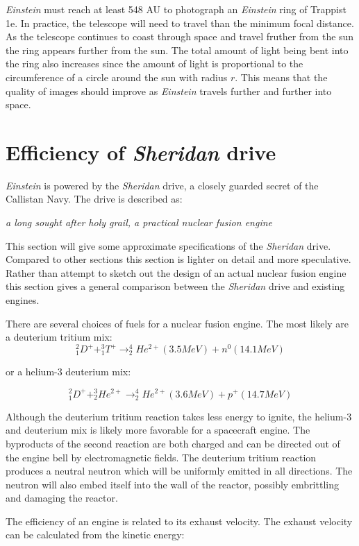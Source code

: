 \documentclass[12pt]{article} %
\begin{document}
\textit{Einstein} must reach at least 548 AU to photograph an \textit{Einstein} ring of Trappist 1e. In practice, the telescope will need to travel than the minimum focal distance. As the telescope continues to coast through space and travel fruther from the sun the  ring appears further from the sun. The total amount of light being bent into the ring also increases since the amount of light is proportional to the circumference of a circle around the sun with radius $r$. This means that the quality of images should improve as \textit{Einstein} travels further and further into space.

\section{Efficiency of \textit{Sheridan} drive}
\textit{Einstein} is powered by the \textit{Sheridan} drive, a closely guarded secret of the Callistan Navy. The drive is described as:

\hspace{2cm} \textit{a long sought after holy grail, a practical nuclear fusion engine}

This section will give some approximate specifications of the \textit{Sheridan} drive. Compared to other sections this section is lighter on detail and more speculative. Rather than attempt to sketch out the design of an actual nuclear fusion engine this section gives a general comparison between the \textit{Sheridan} drive and existing engines.

There are several choices of fuels for a nuclear fusion engine. The most likely are a deuterium tritium mix:
$$^2_1D^+ + ^3_1T^+ \rightarrow ^4_2He^{2+} (3.5 MeV) + n^0 (14.1 MeV)$$

or a helium-3 deuterium mix:

$$^2_1D^+ + ^3_2He^{2+} \rightarrow ^4_2He^{2+} (3.6 MeV) + p^+ (14.7 MeV)$$

Although the deuterium tritium reaction takes less energy to ignite, the helium-3 and deuterium mix is likely more favorable for a spacecraft engine. The byproducts of the second reaction are both charged and can be directed out of the engine bell by electromagnetic fields. The deuterium tritium reaction produces a neutral neutron which will be uniformly emitted in all directions. The neutron will also embed itself into the wall of the reactor, possibly embrittling and damaging the reactor.

The efficiency of an engine is related to its exhaust velocity. The exhaust velocity can be calculated from the kinetic energy:
\end{document}
